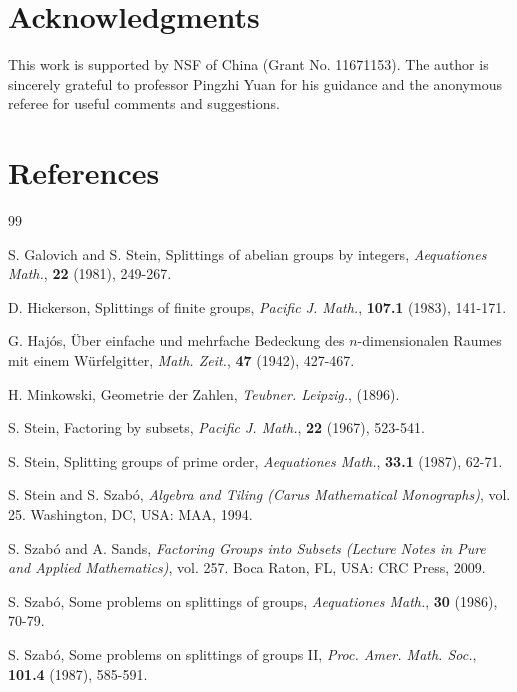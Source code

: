 \documentclass[preprint]{elsarticle}
\begin{document}
\section*{Acknowledgments}
This work is supported by NSF of China  (Grant No. 11671153).
The author is sincerely grateful to professor Pingzhi Yuan for his guidance and the anonymous referee
for useful comments and suggestions.

\section*{References}

%
\begin{thebibliography}{99}

\bibitem{[GS]} S. Galovich and S. Stein, Splittings of abelian groups by integers, {\it Aequationes Math.}, {\bf 22} (1981), 249-267.

\bibitem{[H]} D. Hickerson, Splittings of finite groups, {\it Pacific J. Math.}, {\bf 107.1} (1983), 141-171.

\bibitem{[GH]} G. Haj\'{o}s, \"{U}ber einfache und mehrfache Bedeckung des $n$-dimensionalen Raumes mit einem W\"{u}rfelgitter, {\it Math. Zeit.}, {\bf 47} (1942), 427-467.

\bibitem{[HM]} H. Minkowski, Geometrie der Zahlen, {\it Teubner. Leipzig.}, (1896).

 S. Stein, Factoring by subsets, {\it Pacific J. Math.}, {\bf 22} (1967), 523-541.

 S. Stein, Splitting groups of prime order, {\it Aequationes Math.}, {\bf 33.1} (1987), 62-71.

 S. Stein and S. Szab\'{o}, {\it Algebra and Tiling (Carus Mathematical
Monographs)}, vol. 25. Washington, DC, USA: MAA,
1994.

\bibitem{[SS]}S. Szab\'{o} and A. Sands, {\it Factoring Groups into Subsets (Lecture Notes
in Pure and Applied Mathematics)}, vol. 257. Boca Raton, FL, USA: CRC Press, 2009.

 S. Szab\'{o}, Some problems on splittings of groups, {\it Aequationes Math.}, {\bf 30} (1986), 70-79.

 S. Szab\'{o}, Some problems on splittings of groups II, {\it Proc. Amer. Math. Soc.}, {\bf 101.4} (1987), 585-591.

\end{thebibliography}
\end{document}
